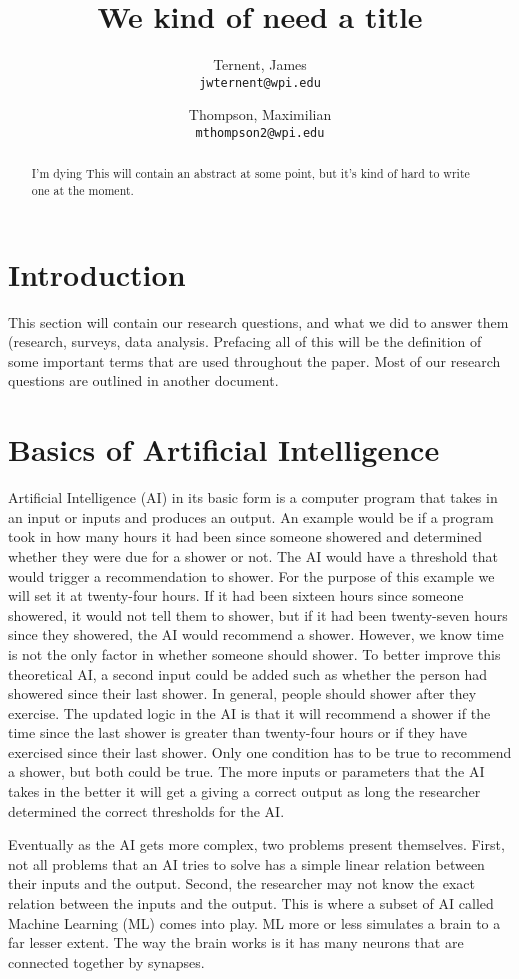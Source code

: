 \documentclass[]{article}
\title{We kind of need a title}
\author{
  Ternent, James\\
  \texttt{jwternent@wpi.edu}
  \and
  Thompson, Maximilian\\
  \texttt{mthompson2@wpi.edu}
}
\begin{document}
	
	\maketitle
	
	\begin{abstract}
		I'm dying This will contain an abstract at some point, but it’s kind of hard to write one at the moment.
	\end{abstract}
	
	\section{Introduction}
		This section will contain our research questions, and what we did to answer them (research, surveys, data analysis. Prefacing all of this will be the definition of some important terms that are used throughout the paper. Most of our research questions are outlined in another document.
		
	\section{Basics of Artificial Intelligence}
		Artificial Intelligence (AI) in its basic form is a computer program that takes in an input or inputs and produces an output.  An example would be if a program took in how many hours it had been since someone showered and determined whether they were due for a shower or not.  The AI would have a threshold that would trigger a recommendation to shower.  For the purpose of this example we will set it at twenty-four hours.  If it had been sixteen hours since someone showered, it would not tell them to shower, but if it had been twenty-seven hours since they showered, the AI would recommend a shower.  However, we know time is not the only factor in whether someone should shower.  To better improve this theoretical AI, a second input could be added such as whether the person had showered since their last shower.  In general, people should shower after they exercise.  The updated logic in the AI is that it will recommend a shower if the time since the last shower is greater than twenty-four hours or if they have exercised since their last shower. Only one condition has to be true to recommend a shower, but both could be true.  The more inputs or parameters that the AI takes in the better it will get a giving a correct output as long the researcher determined the correct thresholds for the AI.

		Eventually as the AI gets more complex, two problems present themselves.  First, not all problems that an AI tries to solve has a simple linear relation between their inputs and the output.  Second, the researcher may not know the exact relation between the inputs and the output.  This is where a subset of AI called Machine Learning (ML) comes into play.  ML more or less simulates a brain to a far lesser extent.  The way the brain works is it has many neurons that are connected together by synapses.
\end{document}

